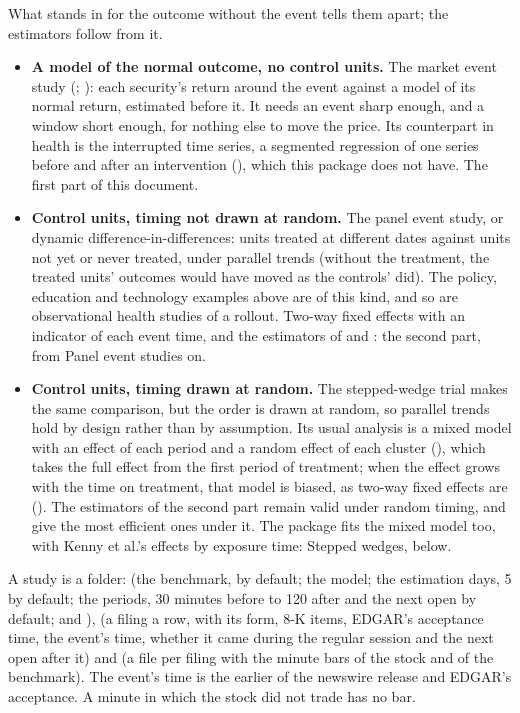 What stands in for the outcome without the event tells them apart; the estimators follow from it.
\begin{itemize}
  \item \textbf{A model of the normal outcome, no control units.} The market event study
    (; ): each security's
    return around the event against a model of its normal return, estimated before it. It needs an event sharp enough,
    and a window short enough, for nothing else to move the price. Its counterpart in health is the interrupted time
    series, a segmented regression of one series before and after an intervention (), which this package does not have. The first part of this document.
  \item \textbf{Control units, timing not drawn at random.} The panel event study, or dynamic difference-in-differences:
    units treated at different dates against units not yet or never treated, under parallel trends (without the
    treatment, the treated units' outcomes would have moved as the controls' did). The policy, education and technology
    examples above are of this kind, and so are observational health studies of a rollout. Two-way fixed effects with
    an indicator of each event time, and the estimators of  and
    : the second part, from Panel event studies on.
  \item \textbf{Control units, timing drawn at random.} The stepped-wedge trial makes the same comparison, but the order
    is drawn at random, so parallel trends hold by design rather than by assumption. Its usual analysis is a mixed model
    with an effect of each period and a random effect of each cluster (), which
    takes the full effect from the first period of treatment; when the effect grows with the time on treatment, that
    model is biased, as two-way fixed effects are (). The estimators of the second
    part remain valid under random timing, and  give the most efficient ones
    under it. The package fits the mixed model too, with Kenny et al.'s effects by exposure time: Stepped wedges, below.
\end{itemize}

A study is a folder:  (the benchmark,  by default; the model; the estimation days, 5 by
default; the periods, 30 minutes before to 120 after and the next open by default; and ),
 (a filing a row, with its form, 8-K items, EDGAR's acceptance time, the event's time, whether it came
during the regular session and the next open after it) and  (a file per filing with the minute bars of the
stock and of the benchmark). The event's time is the earlier of the newswire release and EDGAR's acceptance. A minute in
which the stock did not trade has no bar.

